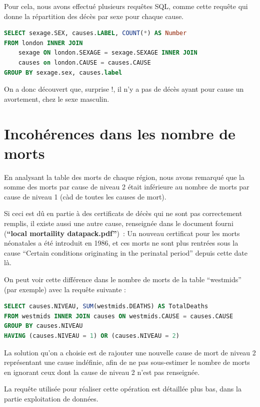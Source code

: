     Pour cela, nous avons effectué plusieurs requêtes SQL, comme cette requête qui donne la répartition des décès par sexe pour chaque
    cause.

    \begin{lstlisting}[frame=single, language=SQL]
SELECT sexage.SEX, causes.LABEL, COUNT(*) AS Number
FROM london INNER JOIN
    sexage ON london.SEXAGE = sexage.SEXAGE INNER JOIN
    causes on london.CAUSE = causes.CAUSE
GROUP BY sexage.sex, causes.label
    \end{lstlisting}

    On a donc découvert que, surprise !, il n'y a pas de décès ayant pour cause un avortement, chez le sexe masculin.

\section{Incohérences dans les nombre de morts}

    En analysant la table des morts de chaque région, nous avons remarqué que la somme des morts par cause de niveau 2 était
    inférieure au nombre de morts par cause de niveau 1 (càd de toutes les causes de mort).

    Si ceci est dû en partie à des certificats de décès qui ne sont pas correctement remplis, il existe aussi une autre cause,
    renseignée dans le document fourni (\textbf{``local mortaility datapack.pdf''})~: Un nouveau certificat pour les morts néonatales
    a été introduit en 1986, et ces morts ne sont plus rentrées sous la cause ``Certain conditions originating in the perinatal
    period'' depuis cette date là.

    On peut voir cette différence dans le nombre de morts de la table ``westmids'' (par exemple) avec la requête suivante :

    \begin{lstlisting}[frame=single, language=SQL]
SELECT causes.NIVEAU, SUM(westmids.DEATHS) AS TotalDeaths
FROM westmids INNER JOIN causes ON westmids.CAUSE = causes.CAUSE
GROUP BY causes.NIVEAU
HAVING (causes.NIVEAU = 1) OR (causes.NIVEAU = 2)
    \end{lstlisting}

    La solution qu'on a choisie est de rajouter une nouvelle cause de mort de niveau 2 représentant une cause indéfinie, afin
    de ne pas sous-estimer le nombre de morts en ignorant ceux dont la cause de niveau 2 n'est pas renseignée.

    La requête utilisée pour réaliser cette opération est détaillée plus bas, dans la partie exploitation de données.

